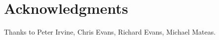\documentclass{article}
\begin{document}
\section*{Acknowledgments}
Thanks to Peter Irvine, Chris Evans, Richard Evans, Michael Mateas.



\end{document}
